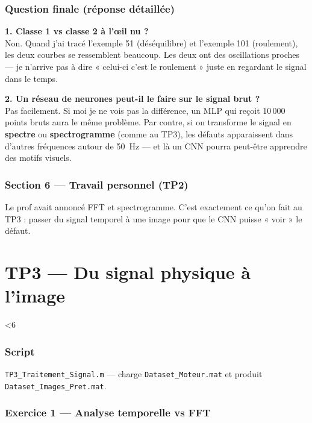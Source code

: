 ﻿\documentclass[11pt,a4paper]{article}
\newcommand{\setfigw}[1]{%
  \ifnum#1<6
    \def\figw{1.0\linewidth}%
  \else
    \def\figw{0.8\linewidth}%
  \fi
}
\begin{document}
\section{Question finale (réponse détaillée)}

\textbf{1. Classe 1 vs classe 2 à l'œil nu ?}\\
Non. Quand j'ai tracé l'exemple 51 (déséquilibre) et l'exemple 101 (roulement), les deux courbes se ressemblent beaucoup. Les deux ont des oscillations proches — je n'arrive pas à dire « celui-ci c'est le roulement » juste en regardant le signal dans le temps.

\textbf{2. Un réseau de neurones peut-il le faire sur le signal brut ?}\\
Pas facilement. Si moi je ne vois pas la différence, un MLP qui reçoit 10\,000 points bruts aura le même problème. Par contre, si on transforme le signal en \textbf{spectre} ou \textbf{spectrogramme} (comme au TP3), les défauts apparaissent dans d'autres fréquences autour de 50~Hz — et là un CNN pourra peut-être apprendre des motifs visuels.

\section{Section 6 — Travail personnel (TP2)}
Le prof avait annoncé FFT et spectrogramme. C'est exactement ce qu'on fait au TP3 : passer du signal temporel à une image pour que le CNN puisse « voir » le défaut.

\part{TP3 — Du signal physique à l'image}
\setfigw{4}

\section{Script}
\texttt{TP3\_Traitement\_Signal.m} — charge \texttt{Dataset\_Moteur.mat} et produit \texttt{Dataset\_Images\_Pret.mat}.

\section{Exercice 1 — Analyse temporelle vs FFT}
\end{document}
